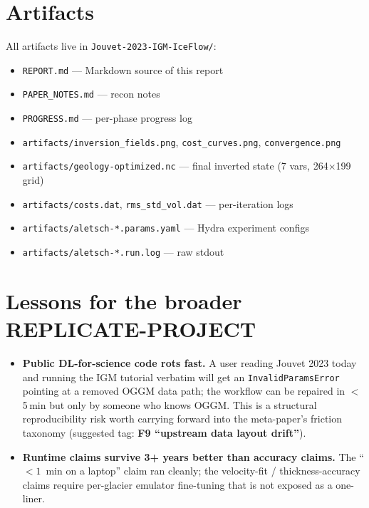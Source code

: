 \documentclass[11pt]{article}
\begin{document}
\section{Artifacts}
All artifacts live in \texttt{Jouvet-2023-IGM-IceFlow/}:
\begin{itemize}
\item \texttt{REPORT.md} --- Markdown source of this report
\item \texttt{PAPER\_NOTES.md} --- recon notes
\item \texttt{PROGRESS.md} --- per-phase progress log
\item \texttt{artifacts/inversion\_fields.png}, \texttt{cost\_curves.png}, \texttt{convergence.png}
\item \texttt{artifacts/geology-optimized.nc} --- final inverted state (7 vars, 264$\times$199 grid)
\item \texttt{artifacts/costs.dat}, \texttt{rms\_std\_vol.dat} --- per-iteration logs
\item \texttt{artifacts/aletsch-*.params.yaml} --- Hydra experiment configs
\item \texttt{artifacts/aletsch-*.run.log} --- raw stdout
\end{itemize}

\section{Lessons for the broader REPLICATE-PROJECT}
\begin{itemize}
\item \textbf{Public DL-for-science code rots fast.} A user reading Jouvet 2023 today and
running the IGM tutorial verbatim will get an \texttt{InvalidParamsError} pointing at a
removed OGGM data path; the workflow can be repaired in $<$5\,min but only by someone who
knows OGGM. This is a structural reproducibility risk worth carrying forward into the
meta-paper's friction taxonomy (suggested tag: \textbf{F9 ``upstream data layout drift''}).
\item \textbf{Runtime claims survive 3+ years better than accuracy claims.} The
``$<\!1$~min on a laptop'' claim ran cleanly; the velocity-fit / thickness-accuracy
claims require per-glacier emulator fine-tuning that is not exposed as a one-liner.
\end{itemize}
\end{document}

